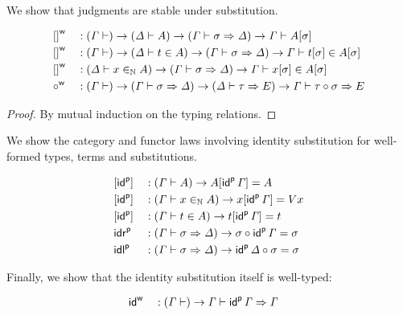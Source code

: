 We show that judgments are stable under substitution.
\begin{lemma}
\begin{alignat*}{5}
  & \wf{[]} && : (\GG \vdash)\ra(\GD \vdash A)\ra
  (\GG \vdash \sigma \Rightarrow \GD) \ra
  \GG \vdash A [ \sigma ]
  \\
  & \wf{[]} && : (\GG \vdash)\ra(\GD \vdash t \in A)\ra
  (\GG \vdash \sigma \Rightarrow \GD) \ra
  \GG \vdash t [\sigma] \in A [ \sigma ]
  \\
  & \wf{[]} && : (\GD \vdash x \invar A)\ra
  (\GG \vdash \sigma \Rightarrow \GD) \ra
  \GG \vdash x [\sigma] \in A [ \sigma ]
  \\
  & \wf{{\circ}} && :
  (\GG \vdash) \ra
  (\GG \vdash \sigma \Rightarrow \GD) \ra
  (\GD \vdash \tau \Rightarrow E) \ra
  \GG \vdash \tau \circ \sigma \Rightarrow E
\end{alignat*}
\end{lemma}
\begin{proof}
By mutual induction on the typing relations.
\end{proof}

We show the category and functor laws involving identity substitution
for well-formed types, terms and substitutions.
\begin{lemma}\label{lem:identity}
\begin{alignat*}{5}
  & [\idu] && : (\GG \vdash A)\ra A [ \idu\,\GG] = A \\
  & [\idu] && : (\GG \vdash x \invar A)\ra x [ \idu\,\GG] = V x \\
  & [\idu] && : (\GG \vdash t \in A)\ra t [ \idu\,\GG] = t \\
  & \idru && : (\GG \vdash \sigma \Rightarrow\GD)\ra \sigma \circ \idu\,\GG = \sigma \\
  & \idlu && : (\GG \vdash \sigma \Rightarrow\GD)\ra \idu\,\GD\circ \sigma = \sigma
  \end{alignat*}
\end{lemma}
Finally, we show that the identity substitution itself is well-typed:
\begin{lemma}
  \begin{alignat*}{5}
  & \idw && : (\GG \vdash)\ra \GG \vdash \idu\,\GG \Rightarrow \GG
  \end{alignat*}
\end{lemma}

